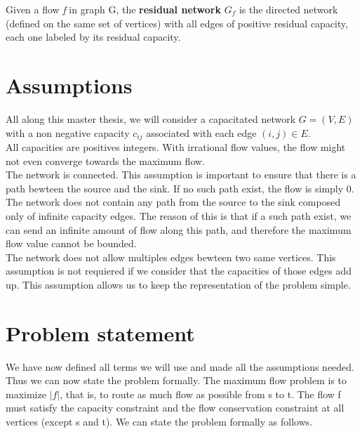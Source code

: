 \begin{definition}
\label{rnetwork}
Given a flow \textit{f} in graph G, the \textbf{residual network} $G_f$ is the directed network (defined on the same set of vertices) with all edges of positive residual capacity, each one labeled by its residual capacity.
\end{definition}


\section{Assumptions}

All along this master thesis, we will  consider a capacitated network $G = (V, E)$ with a non negative  capacity $c_{ij}$ associated with each edge $(i, j) \in E$.\\

All capacities are positives integers. With irrational flow values, the flow might not even converge towards the maximum flow.\\%

The network is connected. This assumption is important to ensure that there is a path bewteen the source and the sink. If no such path exist, the flow is simply $0$.\\

The network does not contain any path from the source to the sink composed only of infinite capacity edges. The reason of this is that if a such path exist, we can send an infinite amount of flow along this path, and therefore the maximum flow value cannot be bounded. \\

The network does not allow multiples edges bewteen two same vertices. This assumption is not requiered if we consider that the capacities of those edges add up. This assumption allows us to keep the representation of the problem simple.

\section{Problem statement}

We have now defined all terms we will use and made all the assumptions needed. Thus we can now state the problem formally. The maximum flow problem is to maximize $\left\vert{f}\right\vert$, that is, to route as much flow as possible from s to t. The flow f must satisfy the capacity constraint and the flow conservation constraint at all vertices (except s and t). We can state the problem formally as follows.

